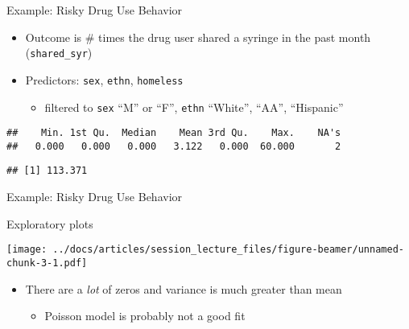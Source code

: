 \documentclass[
  ignorenonframetext,
]{beamer}
\newenvironment{Shaded}{\begin{snugshade}}{\end{snugshade}}
\newcommand{\DataTypeTok}[1]{\textcolor[rgb]{0.13,0.29,0.53}{#1}}
\newcommand{\KeywordTok}[1]{\textcolor[rgb]{0.13,0.29,0.53}{\textbf{#1}}}
\newcommand{\NormalTok}[1]{#1}
\newcommand{\OperatorTok}[1]{\textcolor[rgb]{0.81,0.36,0.00}{\textbf{#1}}}
\newcommand{\OtherTok}[1]{\textcolor[rgb]{0.56,0.35,0.01}{#1}}
\providecommand{\tightlist}{%
  \setlength{\itemsep}{0pt}\setlength{\parskip}{0pt}}
\begin{document}
\begin{frame}[fragile]{Example: Risky Drug Use Behavior}
\protect\hypertarget{example-risky-drug-use-behavior}{}

\begin{itemize}
\tightlist
\item
  Outcome is \# times the drug user shared a syringe in the past month
  (\texttt{shared\_syr})
\item
  Predictors: \texttt{sex}, \texttt{ethn}, \texttt{homeless}

  \begin{itemize}
  \tightlist
  \item
    filtered to \texttt{sex} ``M'' or ``F'', \texttt{ethn} ``White'',
    ``AA'', ``Hispanic''
  \end{itemize}
\end{itemize}

\small

\begin{Shaded}
\end{Shaded}

\begin{verbatim}
##    Min. 1st Qu.  Median    Mean 3rd Qu.    Max.    NA's 
##   0.000   0.000   0.000   3.122   0.000  60.000       2
\end{verbatim}

\begin{Shaded}
\end{Shaded}

\begin{verbatim}
## [1] 113.371
\end{verbatim}

\end{frame}

\begin{frame}{Example: Risky Drug Use Behavior}
\protect\hypertarget{example-risky-drug-use-behavior-1}{}

Exploratory plots

\texttt{[image: ../docs/articles/session\_lecture\_files/figure-beamer/unnamed-chunk-3-1.pdf]}

\begin{itemize}
\tightlist
\item
  There are a \emph{lot} of zeros and variance is much greater than mean

  \begin{itemize}
  \tightlist
  \item
    Poisson model is probably not a good fit
  \end{itemize}
\end{itemize}

\end{frame}
\end{document}
